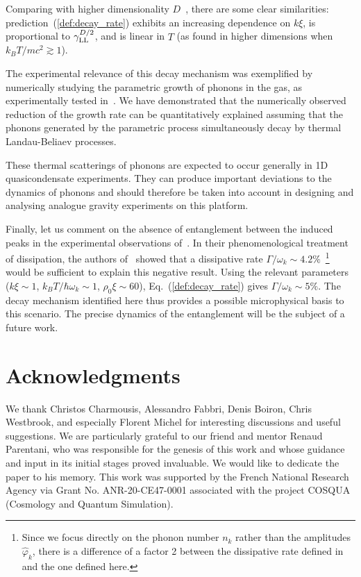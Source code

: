 \documentclass[aps,prd,notitlepage,amsfonts,amssymb,amsmath,nofootinbib,superscriptaddress,longbibliography]{revtex4-2}
\begin{document}
Comparing with higher dimensionality $D$~\cite{pastukhov_damping_2015},  there are some clear similarities: prediction~(\ref{def:decay_rate}) exhibits an increasing dependence on $k \xi$, is proportional to $\gamma_{\rm LL}^{D/2}$, and  is linear in $T$ (as found in higher dimensions when $k_{B} T/ mc^2 \gtrsim 1$).

The experimental relevance of this decay mechanism was exemplified by numerically studying the parametric growth of phonons in the gas, as experimentally tested in~\cite{Jaskula2012}. We have demonstrated that the numerically observed reduction of the growth rate can be quantitatively explained assuming that the phonons generated by the parametric process simultaneously decay by thermal Landau-Beliaev processes.   
 	
These thermal scatterings of phonons are expected to occur generally in 1D quasicondensate experiments. They can produce important deviations to the dynamics of phonons and should therefore be taken into account in designing and analysing analogue gravity experiments on this platform.


Finally, let us comment on the absence of entanglement between the induced peaks in the experimental observations of~\cite{Jaskula2012}.  In their phenomenological treatment of dissipation, the authors of~\cite{Busch-2014} showed that a dissipative rate $\Gamma/\omega_k \sim 4.2 \% $~\footnote{Since we focus directly on the phonon number $n_{k}$ rather than the amplitudes $\hat{\varphi}_{k}$, there is a difference of a factor 2 between the dissipative rate defined in~\cite{Busch-2014} and the one defined here.} would be sufficient to explain this negative result. Using the relevant parameters ($k\xi \sim 1$, $k_{B}T/\hbar\omega_{k} \sim 1$, $\rho_{0}\xi \sim 60$), Eq.~(\ref{def:decay_rate}) gives $\Gamma/\omega_k \sim 5 \% $.  The decay mechanism identified here thus provides a possible microphysical basis to this scenario. The precise dynamics of the entanglement will be the subject of a future work.


\section*{Acknowledgments}
We thank Christos Charmousis, Alessandro Fabbri, Denis Boiron, Chris Westbrook, and especially Florent Michel for interesting discussions and useful suggestions.
We are particularly grateful to our friend and mentor Renaud Parentani, who was responsible for the genesis of this work and whose guidance and input in its initial stages proved invaluable.  We would like to dedicate the paper to his memory.
This work was supported by the French National Research Agency via Grant No. ANR-20-CE47-0001 associated with the project COSQUA (Cosmology and Quantum Simulation).
\end{document}
